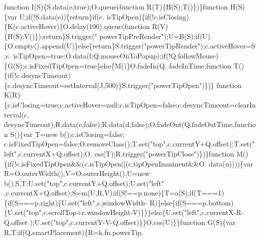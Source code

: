 \begin{DoxyCode}
{{      function} I(S)\{S.data(e,\textcolor{keyword}{true});O.queue(\textcolor{keyword}{function} R(T)\{H(S);T()\})\}\textcolor{keyword}{function} H(S)\{var U;\textcolor{keywordflow}{if}(!S.data(e))\{\textcolor{keywordflow}{return}\}\textcolor{keywordflow}{if}(c.
      isTipOpen)\{\textcolor{keywordflow}{if}(!c.isClosing)\{K(c.activeHover)\}O.delay(100).queue(\textcolor{keyword}{function} R(V)\{H(S);V()\});\textcolor{keywordflow}{return}\}S.trigger(\textcolor{stringliteral}{"
      powerTipPreRender"});U=B(S);\textcolor{keywordflow}{if}(U)\{O.empty().append(U)\}\textcolor{keywordflow}{else}\{\textcolor{keywordflow}{return}\}S.trigger(\textcolor{stringliteral}{"powerTipRender"});c.activeHover=S;c.
      isTipOpen=\textcolor{keyword}{true};O.data(f,Q.mouseOnToPopup);\textcolor{keywordflow}{if}(!Q.followMouse)\{G(S);c.isFixedTipOpen=\textcolor{keyword}{true}\}\textcolor{keywordflow}{else}\{M()\}O.fadeIn(Q.
      fadeInTime,\textcolor{keyword}{function} T()\{\textcolor{keywordflow}{if}(!c.desyncTimeout)\{c.desyncTimeout=setInterval(J,500)\}S.trigger(\textcolor{stringliteral}{"powerTipOpen"})\})\}\textcolor{keyword}{
      function} K(R)\{c.isClosing=\textcolor{keyword}{true};c.activeHover=null;c.isTipOpen=\textcolor{keyword}{false};c.desyncTimeout=clearInterval(c.
      desyncTimeout);R.data(e,\textcolor{keyword}{false});R.data(d,\textcolor{keyword}{false});O.fadeOut(Q.fadeOutTime,\textcolor{keyword}{function} S()\{var T=\textcolor{keyword}{new} b();c.isClosing=\textcolor{keyword}{false};
      c.isFixedTipOpen=\textcolor{keyword}{false};O.removeClass();T.set(\textcolor{stringliteral}{"top"},c.currentY+Q.offset);T.set(\textcolor{stringliteral}{"left"},c.currentX+Q.offset);O.
      css(T);R.trigger(\textcolor{stringliteral}{"powerTipClose"})\})\}\textcolor{keyword}{function} M()\{\textcolor{keywordflow}{if}(!c.isFixedTipOpen&&(c.isTipOpen||(c.tipOpenImminent&&O.
      data(u))))\{var R=O.outerWidth(),V=O.outerHeight(),U=\textcolor{keyword}{new} b(),S,T;U.set(\textcolor{stringliteral}{"top"},c.currentY+Q.offset);U.set(\textcolor{stringliteral}{"left"}
      ,c.currentX+Q.offset);S=m(U,R,V);\textcolor{keywordflow}{if}(S!==p.none)\{T=a(S);\textcolor{keywordflow}{if}(T===1)\{\textcolor{keywordflow}{if}(S===p.right)\{U.set(\textcolor{stringliteral}{"left"},c.windowWidth-
      R)\}\textcolor{keywordflow}{else}\{\textcolor{keywordflow}{if}(S===p.bottom)\{U.set(\textcolor{stringliteral}{"top"},c.scrollTop+c.windowHeight-V)\}\}\}\textcolor{keywordflow}{else}\{U.set(\textcolor{stringliteral}{"left"},c.currentX-R-Q.offset
      );U.set(\textcolor{stringliteral}{"top"},c.currentY-V-Q.offset)\}\}O.css(U)\}\}\textcolor{keyword}{function} G(S)\{var R,T;\textcolor{keywordflow}{if}(Q.smartPlacement)\{R=k.fn.powerTip.
}
\end{DoxyCode}
